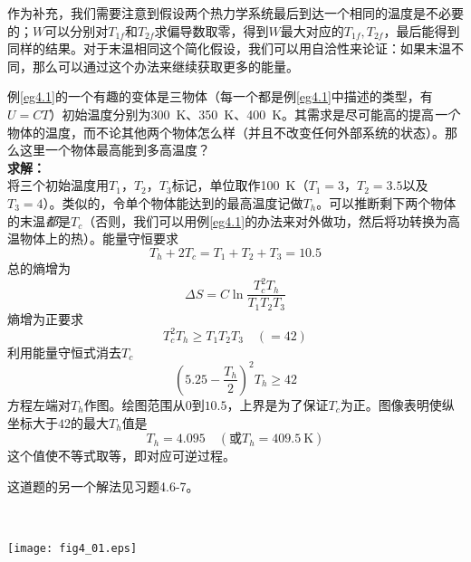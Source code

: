 作为补充，我们需要注意到假设两个热力学系统最后到达一个相同的温度是不必要的；$W$可以分别对$T_{1f}$和$T_{2f}$求偏导数取零，得到$W$最大对应的$T_{1f}, T_{2f}$，最后能得到同样的结果。对于末温相同这个简化假设，我们可以用自洽性来论证：如果末温不同，那么可以通过这个办法来继续获取更多的能量。

\begin{example}\label{eg4.2}
例\ref{eg4.1}的一个有趣的变体是三物体（每一个都是例\ref{eg4.1}中描述的类型，有$U=CT$）初始温度分别为\SI{300}{\kelvin}、\SI{350}{\kelvin}、\SI{400}{\kelvin}。其需求是尽可能高的提高{\it 一个}物体的温度，而不论其他两个物体怎么样（并且不改变任何外部系统的状态）。那么这里一个物体最高能到多高温度？\\
{\bf 求解：}\\
将三个初始温度用$T_1$，$T_2$，$T_3$标记，单位取作\SI{100}{\kelvin}（$T_1=3$，$T_2=3.5$以及$T_3=4$）。类似的，令单个物体能达到的最高温度记做$T_h$。可以推断剩下两个物体的末温{\it 都}是$T_c$（否则，我们可以用例\ref{eg4.1}的办法来对外做功，然后将功转换为高温物体上的热）。能量守恒要求
\[
T_h + 2T_c = T_1 + T_2 + T_3 = 10.5
\]
总的熵增为
\[
\Delta S = C\ln\frac{T_c^2T_h}{T_1T_2T_3}
\]
熵增为正要求
\[
T_c^2T_h \ge T_1T_2T_3 \quad (=42)
\]
利用能量守恒式消去$T_c$
\[
(5.25-\frac{T_h}{2})^2T_h\ge 42
\]
方程左端对$T_h$作图。绘图范围从$0$到$10.5$，上界是为了保证$T_c$为正。图像表明使纵坐标大于$42$的最大$T_h$值是
\[
T_h = 4.095 \quad(\text{或}T_h = \SI{409.5}{\kelvin})
\]
这个值使不等式取等，即对应可逆过程。
\end{example}

这道题的另一个解法见习题4.6-7。

\ 

{
	\centering
	\texttt{[image: fig4\_01.eps]} 
}

